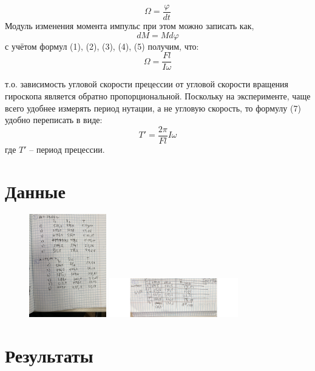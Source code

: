 \documentclass[a4paper]{article}
\begin{document}
\begin{equation}
    \Omega = \frac{\varphi}{d t}
\end{equation}
Модуль изменения момента импульс при этом можно записать
как,
\begin{equation}
    d M = M d \varphi
\end{equation}
с учётом формул (1), (2), (3), (4), (5) получим, что:
\begin{equation}
\Omega = \frac{Fl}{I\omega}
\end{equation}

т.о. зависимость угловой скорости прецессии от угловой скорости вращения гироскопа является обратно пропорциональной. Поскольку на эксперименте, чаще всего удобнее измерять период
нутации, а не угловую скорость, то формулу (7) удобно переписать в виде:
\begin{equation}
    T'=\dfrac{2\pi}{Fl}I\omega
\end{equation}
где $T'$ – период прецессии.


\section{\textbf{Данные}}

\begin{figure}[H]
\begin{center}
\includegraphics[width=0.3\textwidth]{pick_2.png}
\includegraphics[width=0.5\textwidth]{pick_3.png}
\end{center}
\end{figure}


\section{\textbf{Результаты}}
\end{document}
